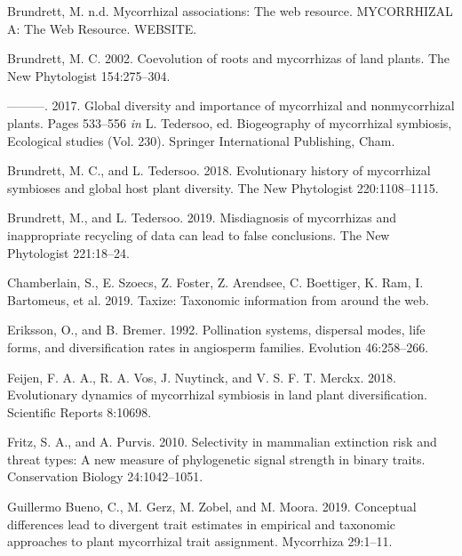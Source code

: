 \documentclass[
  12pt,
]{article}
\newenvironment{cslreferences}%
  {}%
  {\par}
\begin{document}
\hypertarget{refs}{}
\begin{cslreferences}
\leavevmode\hypertarget{ref-brundrett_website_2008}{}%
Brundrett, M. n.d. Mycorrhizal associations: The web resource.
MYCORRHIZAL A: The Web Resource. WEBSITE.

\leavevmode\hypertarget{ref-brundrett_2002}{}%
Brundrett, M. C. 2002. Coevolution of roots and mycorrhizas of land
plants. The New Phytologist 154:275--304.

\leavevmode\hypertarget{ref-brundrett_2017}{}%
---------. 2017. Global diversity and importance of mycorrhizal and
nonmycorrhizal plants. Pages 533--556 \emph{in} L. Tedersoo, ed.
Biogeography of mycorrhizal symbiosis, Ecological studies (Vol. 230).
Springer International Publishing, Cham.

\leavevmode\hypertarget{ref-brundrett_2018}{}%
Brundrett, M. C., and L. Tedersoo. 2018. Evolutionary history of
mycorrhizal symbioses and global host plant diversity. The New
Phytologist 220:1108--1115.

\leavevmode\hypertarget{ref-brundrett_2019}{}%
Brundrett, M., and L. Tedersoo. 2019. Misdiagnosis of mycorrhizas and
inappropriate recycling of data can lead to false conclusions. The New
Phytologist 221:18--24.

\leavevmode\hypertarget{ref-chamberlain_2019}{}%
Chamberlain, S., E. Szoecs, Z. Foster, Z. Arendsee, C. Boettiger, K.
Ram, I. Bartomeus, et al. 2019. Taxize: Taxonomic information from
around the web.

\leavevmode\hypertarget{ref-eriksson_1992}{}%
Eriksson, O., and B. Bremer. 1992. Pollination systems, dispersal modes,
life forms, and diversification rates in angiosperm families. Evolution
46:258--266.

\leavevmode\hypertarget{ref-feijen_2018}{}%
Feijen, F. A. A., R. A. Vos, J. Nuytinck, and V. S. F. T. Merckx. 2018.
Evolutionary dynamics of mycorrhizal symbiosis in land plant
diversification. Scientific Reports 8:10698.

\leavevmode\hypertarget{ref-fritz_2010}{}%
Fritz, S. A., and A. Purvis. 2010. Selectivity in mammalian extinction
risk and threat types: A new measure of phylogenetic signal strength in
binary traits. Conservation Biology 24:1042--1051.

\leavevmode\hypertarget{ref-guillermobueno_2019}{}%
Guillermo Bueno, C., M. Gerz, M. Zobel, and M. Moora. 2019. Conceptual
differences lead to divergent trait estimates in empirical and taxonomic
approaches to plant mycorrhizal trait assignment. Mycorrhiza 29:1--11.


\end{cslreferences}
\end{document}
